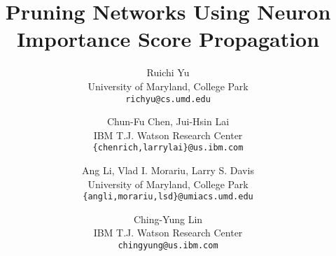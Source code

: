 \documentclass[10pt,twocolumn,letterpaper]{article}
\begin{document}
\title{Pruning Networks Using Neuron Importance Score Propagation}


\author{Ruichi Yu\\
University of Maryland, College Park\\
{\tt\small richyu@cs.umd.edu}
\and
Chun-Fu Chen, Jui-Hsin Lai\\
IBM T.J. Watson Research Center\\
{\tt\small \{chenrich,larrylai\}@us.ibm.com}
\and
Ang Li, Vlad I. Morariu, Larry S. Davis\\
University of Maryland, College Park\\
{\tt\small \{angli,morariu,lsd\}@umiacs.umd.edu}
\and
Ching-Yung Lin\\
IBM T.J. Watson Research Center\\
{\tt\small chingyung@us.ibm.com}
}



\maketitle
\end{document}
